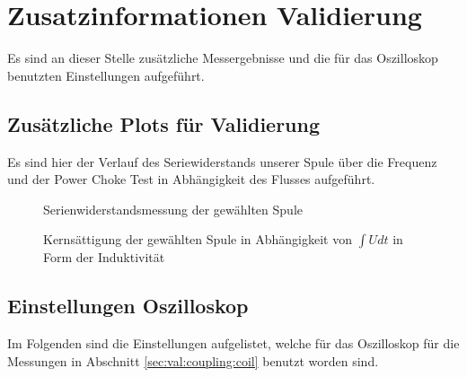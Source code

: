 \chapter{Zusatzinformationen Validierung}
\label{app:validation}

Es  sind an  dieser  Stelle  zus\"atzliche Messergebnisse  und  die f\"ur  das
Oszilloskop benutzten Einstellungen aufgef\"uhrt.

\clearpage
\section{Zus\"atzliche Plots f\"ur Validierung}

Es  sind  hier der  Verlauf  des  Seriewiderstands  unserer Spule  \"uber  die
Frequenz und der Power Choke Test in Abh\"angigkeit des Flusses aufgef\"uhrt.

\begin{figure}[h!tb]
    \centering
    
    \caption[Messresultate Kopplungsspule: Serienwiderstand Spule]{Serienwiderstandsmessung der gew\"ahlten Spule}
    \label{fig:meas:coupling:coil:R}
\end{figure}

\begin{figure}[h!tb]
    \centering
    
    \caption[Messresultate Kopplungsspule: Kerns\"attigung \"uber Fluss]{Kerns\"attigung der gew\"ahlten Spule in Abh\"angigkeit von $\int U dt$ in Form der Induktivit\"at}
    \label{fig:meas:coupling:coil:power_choke:2}
\end{figure}


\clearpage
\section{Einstellungen Oszilloskop}
\label{app:scope:settings}

Im Folgenden sind die Einstellungen  aufgelistet, welche f\"ur das Oszilloskop
f\"ur die  Messungen in  Abschnitt \ref{sec:val:coupling:coil}  benutzt worden
sind.

